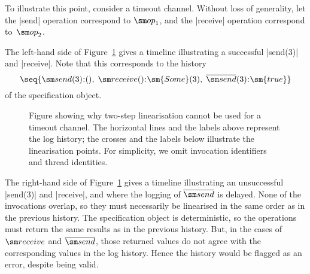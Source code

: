 To illustrate this point, consider a timeout channel.  Without loss of
generality, let the |send| operation correspond to $\op_1$, and the
|receive| operation correspond to~$\op_2$.

The left-hand side of Figure~\ref{fig:two-step-timeout-channel} gives a
timeline illustrating a successful |send(3)| and |receive|.  Note that this
corresponds to the history
\[
\seq{ \send(3)\::(),\; \receive()\::\sm{Some}(3),\; 
  \overline{\send}(3)\::\sm{true} }
\]
of the specification object.


\begin{figure}
\begin{center}
\hfil\hfil
{}
\end{center}
\caption{Figure showing why two-step linearisation cannot be used for a
  timeout channel.  The horizontal lines and the labels above represent the
  log history; the crosses and the labels below illustrate the linearisation
  points.  For simplicity, we omit invocation identifiers and thread
  identities.}
\label{fig:two-step-timeout-channel}
\end{figure}


The right-hand side of Figure~\ref{fig:two-step-timeout-channel} gives a
timeline illustrating an unsuccessful |send(3)| and |receive|, and where the
logging of $\overline{\send}$ is delayed.  None of the invocations overlap, so
they must necessarily be linearised in the same order as in the previous
history.  The specification object is deterministic, so the operations must
return the same results as in the previous history.  But, in the cases of
$\receive$ and $\overline{\send}$, those returned values do not agree with the
corresponding values in the log history.  Hence the history would be flagged
as an error, despite being valid.


